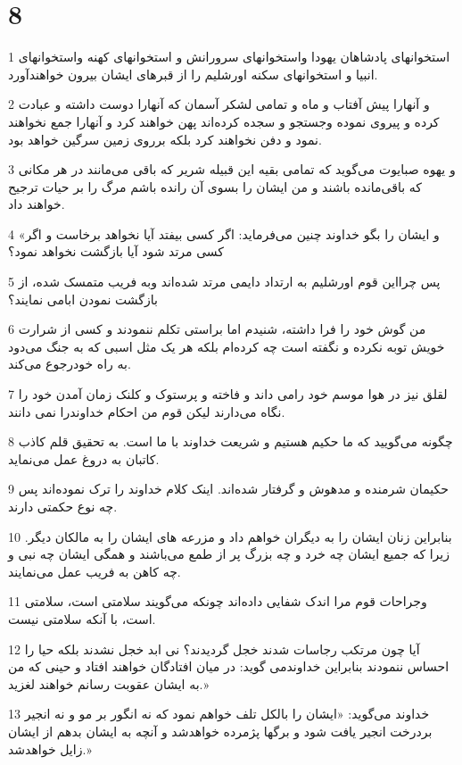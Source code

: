 \chapter{8}

\par 1 استخوانهای پادشاهان یهودا واستخوانهای سرورانش و استخوانهای کهنه واستخوانهای انبیا و استخوانهای سکنه اورشلیم را از قبرهای ایشان بیرون خواهند‌آورد.
\par 2 و آنهارا پیش آفتاب و ماه و تمامی لشکر آسمان که آنهارا دوست داشته و عبادت کرده و پیروی نموده وجستجو و سجده کرده‌اند پهن خواهند کرد و آنهارا جمع نخواهند نمود و دفن نخواهند کرد بلکه برروی زمین سرگین خواهد بود.
\par 3 و یهوه صبایوت می‌گوید که تمامی بقیه این قبیله شریر که باقی می‌مانند در هر مکانی که باقی‌مانده باشند و من ایشان را بسوی آن رانده باشم مرگ را بر حیات ترجیح خواهند داد.
\par 4 «و ایشان را بگو خداوند چنین می‌فرماید: اگر کسی بیفتد آیا نخواهد برخاست و اگر کسی مرتد شود آیا بازگشت نخواهد نمود؟
\par 5 پس چرااین قوم اورشلیم به ارتداد دایمی مرتد شده‌اند وبه فریب متمسک شده، از بازگشت نمودن ابامی نمایند؟
\par 6 من گوش خود را فرا داشته، شنیدم اما براستی تکلم ننمودند و کسی از شرارت خویش توبه نکرده و نگفته است چه کرده‌ام بلکه هر یک مثل اسبی که به جنگ می‌دود به راه خودرجوع می‌کند.
\par 7 لقلق نیز در هوا موسم خود رامی داند و فاخته و پرستوک و کلنک زمان آمدن خود را نگاه می‌دارند لیکن قوم من احکام خداوندرا نمی دانند.
\par 8 چگونه می‌گویید که ما حکیم هستیم و شریعت خداوند با ما است. به تحقیق قلم کاذب کاتبان به دروغ عمل می‌نماید.
\par 9 حکیمان شرمنده و مدهوش و گرفتار شده‌اند. اینک کلام خداوند را ترک نموده‌اند پس چه نوع حکمتی دارند.
\par 10 بنابراین زنان ایشان را به دیگران خواهم داد و مزرعه های ایشان را به مالکان دیگر. زیرا که جمیع ایشان چه خرد و چه بزرگ پر از طمع می‌باشند و همگی ایشان چه نبی و چه کاهن به فریب عمل می‌نمایند.
\par 11 وجراحات قوم مرا اندک شفایی داده‌اند چونکه می‌گویند سلامتی است، سلامتی است، با آنکه سلامتی نیست.
\par 12 آیا چون مرتکب رجاسات شدند خجل گردیدند؟ نی ابد خجل نشدند بلکه حیا را احساس ننمودند بنابراین خداوندمی گوید: در میان افتادگان خواهند افتاد و حینی که من به ایشان عقوبت رسانم خواهند لغزید.»
\par 13 خداوند می‌گوید: «ایشان را بالکل تلف خواهم نمود که نه انگور بر مو و نه انجیر بردرخت انجیر یافت شود و برگها پژمرده خواهدشد و آنچه به ایشان بدهم از ایشان زایل خواهدشد.»
